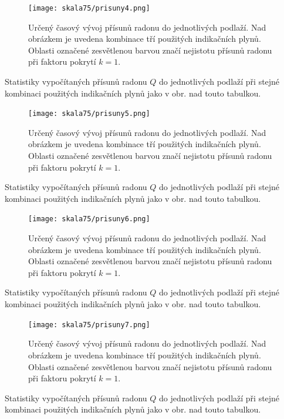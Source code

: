\begin{figure}[H]
    \centering
    \texttt{[image: skala75/prisuny4.png]}
    \caption{Určený časový vývoj přísunů radonu do jednotlivých podlaží. Nad obrázkem je uvedena kombinace tří použitých indikačních plynů. Oblasti označené zesvětlenou barvou značí nejistotu přísunů radonu při faktoru pokrytí $k=1$.}
    \label{fig:skala75_prisuny4}
\end{figure}
\begin{table}[H]
    \centering
    \caption{Statistiky vypočítaných přísunů radonu $Q$ do jednotlivých podlaží při stejné kombinaci použitých indikačních plynů jako v obr. nad touto tabulkou.}
    \label{tab:skala75_prisuny4}
    
\end{table}

\begin{figure}[H]
    \centering
    \texttt{[image: skala75/prisuny5.png]}
    \caption{Určený časový vývoj přísunů radonu do jednotlivých podlaží. Nad obrázkem je uvedena kombinace tří použitých indikačních plynů. Oblasti označené zesvětlenou barvou značí nejistotu přísunů radonu při faktoru pokrytí $k=1$.}
    \label{fig:skala75_prisuny5}
\end{figure}
\begin{table}[H]
    \centering
    \caption{Statistiky vypočítaných přísunů radonu $Q$ do jednotlivých podlaží při stejné kombinaci použitých indikačních plynů jako v obr. nad touto tabulkou.}
    \label{tab:skala75_prisuny5}
    
\end{table}

\begin{figure}[H]
    \centering
    \texttt{[image: skala75/prisuny6.png]}
    \caption{Určený časový vývoj přísunů radonu do jednotlivých podlaží. Nad obrázkem je uvedena kombinace tří použitých indikačních plynů. Oblasti označené zesvětlenou barvou značí nejistotu přísunů radonu při faktoru pokrytí $k=1$.}
    \label{fig:skala75_prisuny6}
\end{figure}
\begin{table}[H]
    \centering
    \caption{Statistiky vypočítaných přísunů radonu $Q$ do jednotlivých podlaží při stejné kombinaci použitých indikačních plynů jako v obr. nad touto tabulkou.}
    \label{tab:skala75_prisuny6}
    
\end{table}

\begin{figure}[H]
    \centering
    \texttt{[image: skala75/prisuny7.png]}
    \caption{Určený časový vývoj přísunů radonu do jednotlivých podlaží. Nad obrázkem je uvedena kombinace tří použitých indikačních plynů. Oblasti označené zesvětlenou barvou značí nejistotu přísunů radonu při faktoru pokrytí $k=1$.}
    \label{fig:skala75_prisuny7}
\end{figure}
\begin{table}[H]
    \centering
    \caption{Statistiky vypočítaných přísunů radonu $Q$ do jednotlivých podlaží při stejné kombinaci použitých indikačních plynů jako v obr. nad touto tabulkou.}
    \label{tab:skala75_prisuny7}
    
\end{table}

